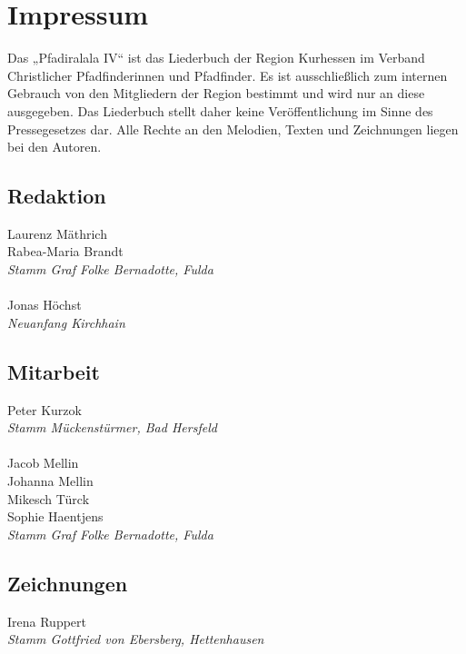 \section*{Impressum}

\vspace{10pt} Das „Pfadiralala IV“ ist das Liederbuch der Region Kurhessen im Verband Christlicher Pfadfinderinnen und Pfadfinder. Es ist ausschließlich zum internen Gebrauch von den Mitgliedern der Region bestimmt und wird nur an diese ausgegeben. Das Liederbuch stellt daher keine Veröffentlichung im Sinne des Pressegesetzes dar. Alle Rechte an den Melodien, Texten und Zeichnungen liegen bei den Autoren. \\ \vspace{10pt} 

\begin{centering}
\begin{multicols}{2}

\subsection*{Redaktion}
Laurenz Mäthrich \\ Rabea-Maria Brandt \\ \textit{Stamm Graf Folke Bernadotte, Fulda} \\ ~\\
Jonas Höchst \\ \textit{Neuanfang Kirchhain} \\

\subsection*{Mitarbeit}
Peter Kurzok \\ \textit{Stamm Mückenstürmer, Bad Hersfeld} \\ ~\\
Jacob Mellin \\ Johanna Mellin \\ Mikesch Türck \\ Sophie Haentjens \\ \textit{Stamm Graf Folke Bernadotte, Fulda} \\

\vfill\null
\columnbreak

\subsection*{Zeichnungen}
Irena Ruppert \\ \textit{Stamm Gottfried von Ebersberg, Hettenhausen} \\ ~\\


\end{multicols}
\end{centering}
